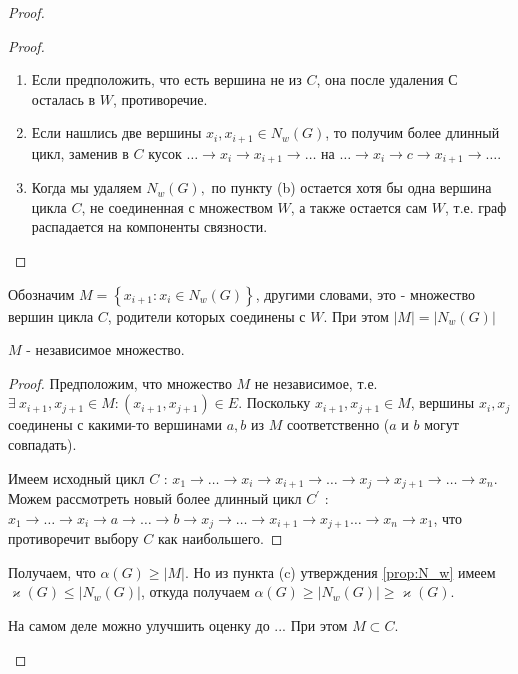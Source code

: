 \begin{proof}
\begin{enumerate}
\begin{prop}
		\end{prop}
		
		\begin{proof}
			\:
			\begin{enumerate} \renewcommand{\theenumi}{\arabic{enumi}}
				\item Если предположить, что есть вершина не из $ C $, она после удаления $ С $ осталась в $ W $, противоречие.
				\item Если нашлись две вершины $ x_i, x_{i + 1} \in N_w(G) $, то получим более длинный цикл, заменив в $ C $ кусок $\dots \rightarrow x_i \rightarrow x_{i + 1} \rightarrow \dots$ на $ \dots \rightarrow x_i \rightarrow c \rightarrow x_{i + 1} \rightarrow \dots$.
				\item Когда мы удаляем $ N_w(G), $ по пункту (b) остается хотя бы одна вершина цикла $ C $, не соединенная с множеством $ W $, а также остается сам $ W $, т.е. граф распадается на компоненты связности.
			\end{enumerate}
		\end{proof}
		Обозначим $ M = \left\lbrace x_{i + 1} : x_i \in N_w(G)\right\rbrace $, другими словами, это - множество вершин цикла $ C $, родители которых соединены с $ W $. При этом $ |M| = |N_w(G)| $
		\begin{prop}
			$ M $ - независимое множество.
		\end{prop}
		\begin{proof}
			Предположим, что множество $ M $ не независимое, т.е. $ \exists\: x_{i + 1}, x_{j + 1} \in M : (x_{i + 1}, x_{j + 1}) \in E $. Поскольку $ x_{i + 1}, x_{j + 1} \in M $, вершины $ x_{i}, x_{j} $ соединены с какими-то вершинами $ a, b $ из $ M $ соответственно ($ a $ и $ b $ могут совпадать).
			
			
			Имеем исходный цикл $ C $ : $x_1 \rightarrow \dots \rightarrow x_i \rightarrow x_{i + 1} \rightarrow \dots \rightarrow x_j \rightarrow x_{j + 1} \rightarrow \dots \rightarrow x_n$. Можем рассмотреть новый более длинный цикл $ C^\prime $ :
			$x_1 \rightarrow \dots \rightarrow x_i \rightarrow a \rightarrow \dots \rightarrow b \rightarrow x_j \rightarrow \ldots \rightarrow x_{i + 1} \rightarrow x_{j + 1} \dots \rightarrow x_n \rightarrow x_1$, что противоречит выбору $ C $ как наибольшего.
			
		\end{proof}
		Получаем, что $ \alpha(G) \geqslant |M|$. Но из пункта (c) утверждения \ref{prop:N_w} имеем $ \varkappa(G) \leqslant |N_w(G)| $, откуда получаем $ \alpha(G) \geqslant  |N_w(G)| \geqslant \varkappa(G) $.
		
		\begin{note}
			 На самом деле можно улучшить оценку до ... При этом $ M \subset C $.
		\end{note}
			
	\end{enumerate}
\end{proof}

